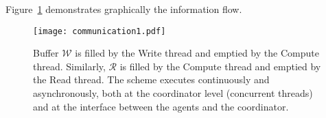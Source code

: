 \documentclass[envcountsect]{svjour3}
\newcommand{\reals}{{\mathbb{R} }}
\begin{document}
Figure~\ref{fig::communication} demonstrates graphically the information flow.
\begin{figure}[!htb]
  \begin{center}
  \texttt{[image: communication1.pdf]}
  \caption{Buffer $\mathcal{W}$ is filled by the Write thread and emptied by the Compute thread. Similarly, $\mathcal{R}$ is filled by the Compute thread and emptied by the Read thread. The scheme executes continuously and asynchronously, both at the coordinator level (concurrent threads) and at the interface between the agents and the coordinator.}
  \label{fig::communication}
  \end{center}
\end{figure}




\end{document}
